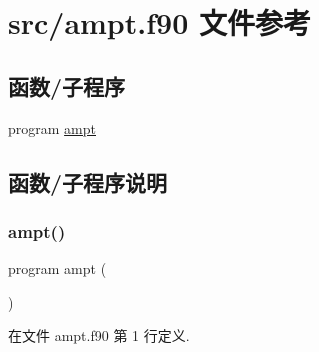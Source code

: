 \hypertarget{ampt_8f90}{}\section{src/ampt.f90 文件参考}
\label{ampt_8f90}
\subsection*{函数/子程序}
\begin{DoxyCompactItemize}
\item 
program \mbox{\hyperlink{ampt_8f90_a417dc946c8fac1735981b61d5244a725}{ampt}}
\end{DoxyCompactItemize}


\subsection{函数/子程序说明}
\mbox{\label{ampt_8f90_a417dc946c8fac1735981b61d5244a725}} 
\subsubsection{\texorpdfstring{ampt()}{ampt()}}
{\footnotesize\ttfamily program ampt (\begin{DoxyParamCaption}{ }\end{DoxyParamCaption})}



在文件 ampt.\+f90 第 1 行定义.

